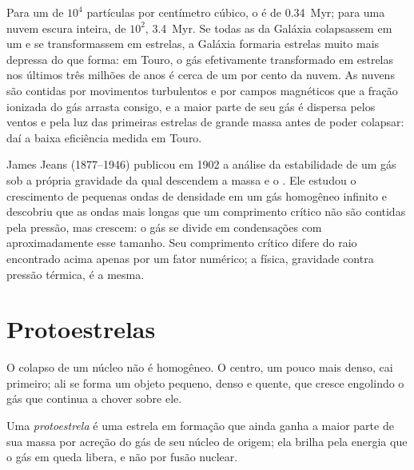Para um  de $10^4$ partículas por centímetro cúbico, o 
é de \qty{0.34}{Myr}; para uma nuvem escura inteira, de $10^2$, \qty{3.4}{Myr}. Se todas as
 da Galáxia colapsassem em um  e se transformassem em
estrelas, a Galáxia formaria estrelas muito mais depressa do que forma: em Touro, o gás efetivamente transformado
em estrelas nos últimos três milhões de anos é cerca de um por cento da nuvem. As
nuvens são contidas por movimentos turbulentos e por campos magnéticos que a
fração ionizada do gás arrasta consigo, e a maior parte de seu gás é dispersa pelos
ventos e pela luz das primeiras estrelas de grande massa antes de poder colapsar: daí
a baixa eficiência medida em Touro.

\begin{history}
James Jeans (1877--1946) publicou em 1902 a análise da estabilidade de um
gás sob a própria gravidade da qual descendem a massa e o . Ele
estudou o crescimento de pequenas ondas de densidade em um gás homogêneo infinito e
descobriu que as ondas mais longas que um comprimento crítico não são contidas pela pressão,
mas crescem: o gás se divide em condensações com aproximadamente esse tamanho. Seu comprimento
crítico difere do raio encontrado acima apenas por um fator numérico; a
física, gravidade contra pressão térmica, é a mesma.
\end{history}

\section{Protoestrelas}

O colapso de um núcleo não é homogêneo. O centro, um pouco mais denso, cai
primeiro; ali se forma um objeto pequeno, denso e quente, que cresce engolindo o gás
que continua a chover sobre ele.

\begin{definition}[Protoestrela]\label{def:b2:ism-star-formation:protostar}
Uma \emph{protoestrela} é uma estrela em formação que ainda
ganha a maior parte de sua massa por acreção do gás de seu núcleo de origem; ela
brilha pela energia que o gás em queda libera, e não por fusão nuclear.
\end{definition}

